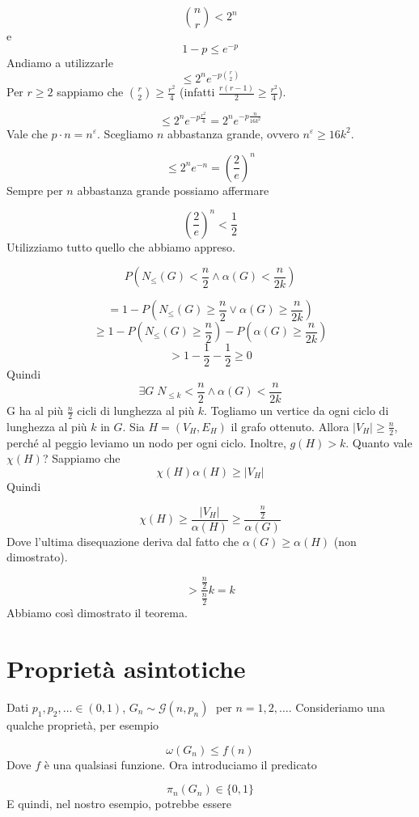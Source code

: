 \documentclass[12pt]{report}
\begin{document}
\begin{dimo}
    $$\binom{n}{r} < 2^n$$
    e
    $$1-p \leq e^{-p}$$
    Andiamo a utilizzarle 
    $$\leq 2^n e^{-p\binom{r}{2}}$$
    Per $r \geq 2$ sappiamo che $\binom{r}{2} \geq \frac{r^2}{4}$ (infatti $\frac{r(r-1)}{2} \geq \frac{r^2}{4}$).

    $$\leq 2^n e^{-p \frac{r^2}{4}} = 2^n e^{-p \frac{n}{16k^2}} $$
    Vale che $p\cdot n = n^\varepsilon$. Scegliamo $n$ abbastanza grande, ovvero $n^\varepsilon \geq 16k^2$.

    $$\leq 2^n e^{-n} = (\frac{2}{e})^n$$
    Sempre per $n$ abbastanza grande possiamo affermare 

    $$(\frac{2}{e})^n < \frac{1}{2}$$
    Utilizziamo tutto quello che abbiamo appreso.

    $$P(N_{\leq}(G)  < \frac{n}{2} \land \alpha(G) < \frac{n}{2k})$$

    $$= 1 - P(N_{\leq}(G)  \geq \frac{n}{2} \lor \alpha(G) \geq \frac{n}{2k})$$
    $$\geq 1 - P(N_{\leq}(G)  \geq \frac{n}{2})- P( \alpha(G) \geq \frac{n}{2k}) $$
    $$> 1  - \frac{1}{2} - \frac{1}{2} \geq 0$$
    Quindi 
    $$\exists G \; N_{\leq k} < \frac{n}{2} \land \alpha(G) < \frac{n}{2k}$$
    G ha al più $\frac{n}{2}$ cicli di lunghezza al più $k$. Togliamo un vertice da ogni ciclo di lunghezza al più $k$ in $G$. Sia $H=(V_H,E_H)$ il grafo ottenuto. Allora $|V_H| \geq \frac{n}{2}$, perché al peggio leviamo un nodo per ogni ciclo. Inoltre,  $g(H) > k$. 
    Quanto vale $\chi(H)$? Sappiamo che
    $$\chi(H) \alpha(H) \geq |V_H|$$
    Quindi

    $$\chi(H) \geq \frac{|V_H|}{\alpha(H)} \geq \frac{\frac{n}{2}}{\alpha(G)}$$
    Dove l'ultima disequazione deriva dal fatto che $\alpha(G) \geq \alpha(H)$ (non dimostrato).

    $$> \frac{\frac{n}{2}}{\frac{n}{2}} k = k$$
    Abbiamo così dimostrato il teorema.
    
\end{dimo}

\section{Proprietà asintotiche}
Dati $p_1,p_2,\dots \in (0,1)$, $G_n \sim \mathscr{G}(n,p_n) \;$ per $n = 1,2,\dots$. Consideriamo una qualche proprietà, per esempio

$$\omega(G_n) \leq f(n)$$
Dove $f$ è una qualsiasi funzione. Ora introduciamo il predicato

$$\pi_n(G_n) \in \{0,1\}$$
E quindi, nel nostro esempio, potrebbe essere
\end{document}
